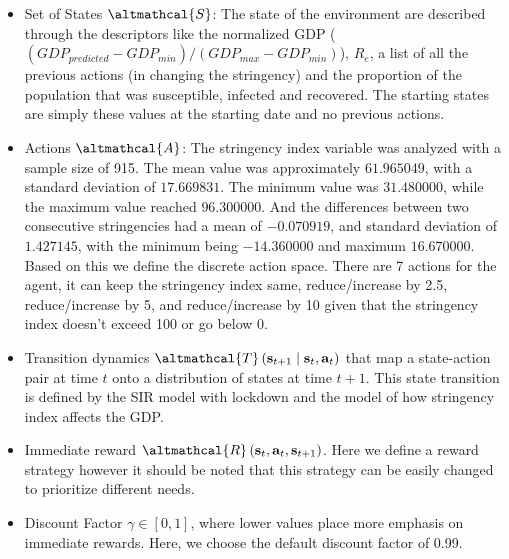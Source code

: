 \documentclass[tikz,fleqn,12pt]{wlscirep}
\begin{document}
\begin{itemize}
    \item Set of States $\altmathcal{S}$: The state of the environment are described through the descriptors like the normalized GDP ($(GDP_{predicted} - GDP_{min}) / (GDP_{max} - GDP_{min})$), $R_e$, a list of all the previous actions (in changing the stringency) and the proportion of the population that was susceptible, infected and recovered. The starting states are simply these values at the starting date and no previous actions.
    \item Actions $\altmathcal{A}$: The stringency index variable was analyzed with a sample size of 915. The mean value was approximately $61.965049$, with a standard deviation of $17.669831$. The minimum value was $31.480000$, while the maximum value reached $96.300000$. And the differences between two consecutive stringencies had a mean of $-0.070919$, and standard deviation of $1.427145$, with the minimum being $-14.360000$ and maximum $16.670000$. Based on this we define the discrete action space. There are 7 actions for the agent, it can keep the stringency index same, reduce/increase by 2.5, reduce/increase by 5, and reduce/increase by 10 given that the stringency index doesn't exceed 100 or go below 0.
    \item Transition dynamics $\altmathcal{T}\left(\mathbf{s}_{t+1} \mid \mathbf{s}_t, \mathbf{a}_t\right)$ that map a state-action pair at time $t$ onto a distribution of states at time $t+1$. This state transition is defined by the SIR model with lockdown and the model of how stringency index affects the GDP.
    \item Immediate reward $\altmathcal{R}\left(\mathbf{s}_t, \mathbf{a}_t, \mathbf{s}_{t+1}\right)$. Here we define a reward strategy however it should be noted that this strategy can be easily changed to prioritize different needs.
    \item Discount Factor $\gamma \in[0,1]$, where lower values place more emphasis on immediate rewards. Here, we choose the default discount factor of 0.99.
\end{itemize}
\end{document}
